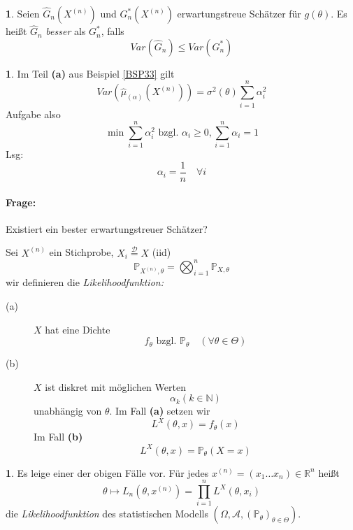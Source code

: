 \documentclass[10pt,a4paper]{report}
\numberwithin{equation}{section}
\numberwithin{figure}{section}
\theoremstyle{plain}
\theoremstyle{definition}
\newtheorem{defn}[thm]{\protect\definitionname}
\newtheorem{example}[thm]{\protect\examplename}
\theoremstyle{remark}
\theoremstyle{plain}
\providecommand{\definitionname}{Definition}
\providecommand{\examplename}{Beispiel}
\newcommand{\1}{ \mathbb{1} } %
\begin{document}
\begin{defn}
Seien $\hat{G}_{n}\left(X^{(n)}\right)$ und $G_{n}^{*}\left(X^{(n)}\right)$
erwartungstreue Schätzer für $g\left(\theta\right)$. Es heißt $\hat{G}_{n}$
\emph{besser} als $G_{n}^{*}$, falls 
\[
Var\left(\hat{G}_{n}\right)\leq Var\left(G_{n}^{*}\right)
\]
\end{defn}
\begin{example}
Im Teil \textbf{(a)} aus Beispiel \ref{BSP33} gilt
\[
Var\left(\hat{\mu}_{\left(\alpha\right)}\left(X^{\left(n\right)}\right)\right)=\sigma^{2}\left(\theta\right)\sum_{i=1}^{n}\alpha_{i}^{2}
\]
 Aufgabe also 
\[
\min\sum_{i=1}^{n}\alpha_{i}^{2}\mbox{ bzgl. }\alpha_{i}\geq0,\sum_{i=1}^{n}\alpha_{i}=1
\]
Lsg: 
\[
\alpha_{i}=\frac{1}{n}\quad\forall i
\]
 
\end{example}

\paragraph*{Frage: }

Existiert ein bester erwartungstreuer Schätzer?

Sei $X^{(n)}$ ein Stichprobe, $X_{i}\overset{\mathcal{D}}{=}X$ (iid)
\[
\mathbb{P}_{X^{(n)},\theta}=\bigotimes_{i=1}^{n}\mathbb{P}_{X,\theta}
\]
wir definieren die \emph{Likelihoodfunktion:}
\begin{description}
\item [{(a)}] $X$ hat eine Dichte 
\[
f_{\theta}\mbox{ bzgl. }\mathbb{P}_{\theta}\quad\left(\forall\theta\in\Theta\right)
\]

\item [{(b)}] $X$ ist diskret mit möglichen Werten 
\[
\alpha_{k}\left(k\in\mathbb{N}\right)
\]
unabhängig von $\theta$. Im Fall \textbf{(a)} setzen wir 
\[
L^{X}\left(\theta,x\right)=f_{\theta}\left(x\right)
\]
Im Fall \textbf{(b)} 
\[
L^{X}\left(\theta,x\right)=\mathbb{P}_{\theta}\left(X=x\right)
\]
\end{description}
\begin{defn}
Es leige einer der obigen Fälle vor. Für jedes $x^{\left(n\right)}=\left(x_{1}\ldots x_{n}\right)\in\mathbb{R}^{n}$
heißt 
\[
\theta\mapsto L_{n}\left(\theta,x^{\left(n\right)}\right)=\prod_{i=1}^{n}L^{X}\left(\theta,x_{i}\right)
\]
die \emph{Likelihoodfunktion} des statistischen
Modells $\left(\Omega,\mathcal{A},\left(\mathbb{P}_{\theta}\right)_{\theta\in\Theta}\right)$.
\end{defn}
\end{document}
